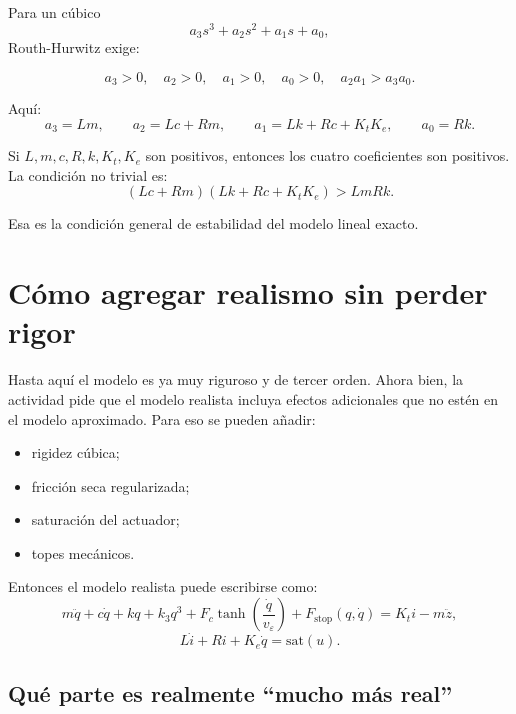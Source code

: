 \documentclass[11pt]{article}
\begin{document}
Para un c\'ubico
\[
a_3s^3+a_2s^2+a_1s+a_0,
\]
Routh-Hurwitz exige:

\begin{equation}
a_3>0,\quad a_2>0,\quad a_1>0,\quad a_0>0,\quad a_2a_1>a_3a_0.
\label{eq:rh}
\end{equation}

Aqu\'i:
\[
a_3=Lm,\qquad
a_2=Lc+Rm,\qquad
a_1=Lk+Rc+K_tK_e,\qquad
a_0=Rk.
\]

Si $L,m,c,R,k,K_t,K_e$ son positivos, entonces los cuatro coeficientes son positivos. La condici\'on no trivial es:
\begin{equation}
(Lc+Rm)(Lk+Rc+K_tK_e) > LmRk.
\label{eq:rh_condition}
\end{equation}

Esa es la condici\'on general de estabilidad del modelo lineal exacto.

\section{C\'omo agregar realismo sin perder rigor}

Hasta aqu\'i el modelo es ya muy riguroso y de tercer orden. Ahora bien, la actividad pide que el modelo realista incluya efectos adicionales que no est\'en en el modelo aproximado. Para eso se pueden a\~nadir:

\begin{itemize}[leftmargin=1.2cm]
\item rigidez c\'ubica;
\item fricci\'on seca regularizada;
\item saturaci\'on del actuador;
\item topes mec\'anicos.
\end{itemize}

Entonces el modelo realista puede escribirse como:
\begin{equation}
m\ddot{q} + c\dot{q} + kq + k_3q^3
+ F_c\tanh\left(\frac{\dot q}{v_\varepsilon}\right)
+ F_{\text{stop}}(q,\dot q)
= K_t i - m\ddot z,
\label{eq:nonlinear_mech}
\end{equation}
\begin{equation}
L\dot i + Ri + K_e\dot q = \mathrm{sat}(u).
\label{eq:nonlinear_elec}
\end{equation}

\subsection{Qu\'e parte es realmente ``mucho m\'as real''}
\end{document}
